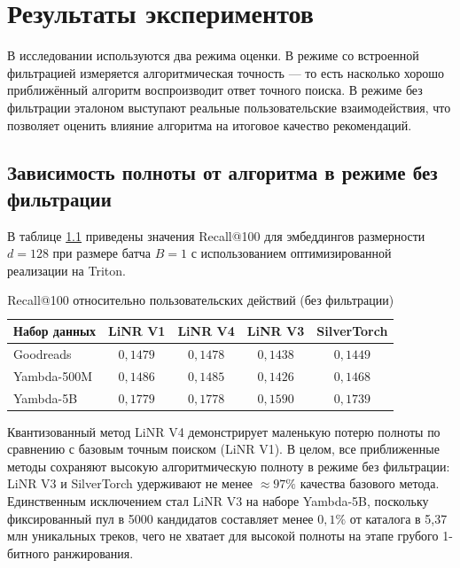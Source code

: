 \documentclass[14pt,a4paper]{extreport}
\numberwithin{figure}{chapter}
\numberwithin{table}{chapter}
\numberwithin{equation}{chapter}
\begin{document}
\chapter{Результаты экспериментов}

В исследовании используются два режима оценки. В режиме со встроенной фильтрацией измеряется алгоритмическая точность --- то есть насколько хорошо приближённый алгоритм воспроизводит ответ точного поиска. В режиме без фильтрации эталоном выступают реальные пользовательские взаимодействия, что позволяет оценить влияние алгоритма на итоговое качество рекомендаций.

\section{Зависимость полноты от алгоритма в режиме без фильтрации}

В таблице \ref{tab:recall_nofilter} приведены значения Recall@100 для эмбеддингов размерности $d = 128$ при размере батча $B = 1$ с использованием оптимизированной реализации на Triton.

\begin{table}[htbp]
    \caption{Recall@100 относительно пользовательских действий (без фильтрации)}
    \label{tab:recall_nofilter}
    \centering
    \begin{tabular}{lcccc}
        \toprule
        Набор данных & LiNR V1 & LiNR V4 & LiNR V3 & SilverTorch \\
        \midrule
        Goodreads & $0{,}1479$ & $0{,}1478$ & $0{,}1438$ & $0{,}1449$ \\
        Yambda-500M & $0{,}1486$ & $0{,}1485$ & $0{,}1426$ & $0{,}1468$ \\
        Yambda-5B & $0{,}1779$ & $0{,}1778$ & $0{,}1590$ & $0{,}1739$ \\
        \bottomrule
    \end{tabular}
\end{table}

Квантизованный метод LiNR V4 демонстрирует маленькую потерю полноты по сравнению с базовым точным поиском (LiNR V1). В целом, все приближенные методы сохраняют высокую алгоритмическую полноту в режиме без фильтрации: LiNR V3 и SilverTorch удерживают не менее $\approx 97\%$ качества базового метода. Единственным исключением стал LiNR V3 на наборе Yambda-5B, поскольку фиксированный пул в 5000 кандидатов составляет менее $0{,}1\%$ от каталога в 5,37 млн уникальных треков, чего не хватает для высокой полноты на этапе грубого 1-битного ранжирования.
\end{document}
